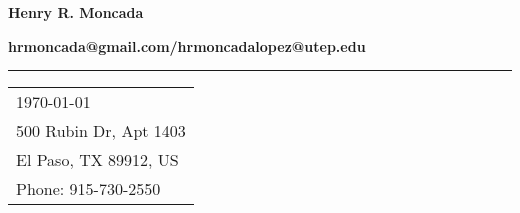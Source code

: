\documentclass[10pt]{article}
\begin{document}

\begin{minipage}{.25\linewidth}
    \begin{flushleft}
{\large\bf Henry R. Moncada}
    \end{flushleft}
\end{minipage}
  \hfill
\begin{minipage}{.65\linewidth}
    \begin{flushright}
{\large\bf hrmoncada@gmail.com/hrmoncadalopez@utep.edu}
    \end{flushright} 
\end{minipage}
\vspace{-1em} %

\rule{\linewidth}{1pt} %



\hfill
\begin{tabular}{l @{}}
	\today \bigskip\\ %
500 Rubin Dr, Apt 1403\\
El Paso, TX 89912, US\\
Phone: 915-730-2550
\end{tabular}



\begin{tabular}{@{} l}
\end{tabular}
\end{document}
